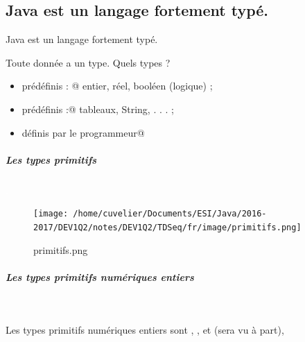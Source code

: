 \documentclass[11pt,a4paper]{article}
\begin{document}
				\subsection{Java est un langage fortement typ\'e.}
			    Java est un langage fortement typ\'e.
			  
            \par
        
          Toute donn\'ee a un type. Quels types ?
          
					\begin{itemize}
				
			\item \verb@primitifs prédéfinis : @ entier, r\'eel, bool\'een (logique) ;
			\item {} prédéfinis :@ tableaux, String, . . . ;
			\item {} définis par le programmeur@
					\end{itemize}
				
            \par
        
			
		\subparagraph{Les types primitifs} 
		
					\textcolor{white}{.} \par
				
            \par
        \begin{figure}[hbt]
				    \begin{center}
					\texttt{[image: /home/cuvelier/Documents/ESI/Java/2016-2017/DEV1Q2/notes/DEV1Q2/TDSeq/fr/image/primitifs.png]}
						\end{center}
                
                    \caption[primitifs.png]{primitifs.png}
                \end{figure}
                    
            \par
        
			
		\subparagraph{Les types primitifs num\'eriques entiers} 
		
					\textcolor{white}{.} \par
				
            \par
        
          Les types primitifs num\'eriques entiers sont
          \verb@byte@, \verb@short@, 
          \verb@int@ et \verb@long@ (\verb@char@ sera vu \`a part),
          
\end{document}
